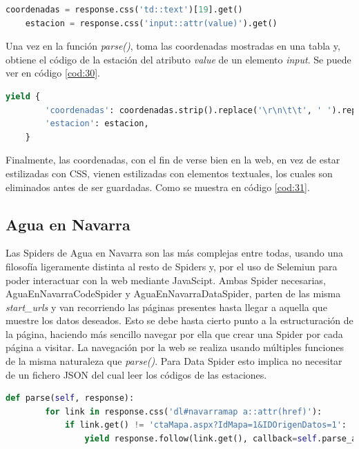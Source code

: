 \begin{lstlisting}[language=Python, caption={Selector en \textit{parse()} de MeteoNavarra Coordenates Spider}, label=cod:30]
	coordenadas = response.css('td::text')[19].get()
	estacion = response.css('input::attr(value)').get()
\end{lstlisting}

Una vez en la función \textit{parse()}, toma las coordenadas mostradas en una tabla y, obtiene el código de la estación del atributo \textit{value} de un elemento \textit{input}. Se puede ver en código \ref{cod:30}.

\begin{lstlisting}[language=Python, caption={Guardado de datos de MeteoNavarra Coordenates Spider}, label=cod:31]
	yield {
		'coordenadas': coordenadas.strip().replace('\r\n\t\t', ' ').replace(' (*)', ''),
		'estacion': estacion,
	}
\end{lstlisting}

Finalmente, las coordenadas, con el fin de verse bien en la web, en vez de estar estilizadas con CSS, vienen estilizadas con elementos textuales, los cuales son eliminados antes de ser guardadas. Como se muestra en código \ref{cod:31}.

\subsection{Agua en Navarra}
Las Spiders de Agua en Navarra son las más complejas entre todas, usando una filosofía ligeramente distinta al resto de Spiders y, por el uso de Selemiun para poder interactuar con la web mediante JavaScipt.\newline
\newline
\label{Chap524}
Ambas Spider necesarias, AguaEnNavarraCodeSpider y AguaEnNavarraDataSpider, parten de las misma \textit{start\_urls} y van recorriendo las páginas presentes hasta llegar a aquella que muestre los datos deseados. Esto se debe hasta cierto punto a la estructuración de la página, haciendo más sencillo navegar por ella que crear una Spider por cada página a visitar. La navegación por la web se realiza usando múltiples funciones de la misma naturaleza que \textit{parse()}. Para Data Spider esto implica no necesitar de un fichero JSON del cual leer los códigos de las estaciones.

\begin{lstlisting}[language=Python, caption={Función \textit{parse()} Agua en Navarra Spiders}, label=cod:32]
	def parse(self, response):
		for link in response.css('dl#navarramap a::attr(href)'):
			if link.get() != 'ctaMapa.aspx?IdMapa=1&IDOrigenDatos=1':
				yield response.follow(link.get(), callback=self.parse_area)
\end{lstlisting}


